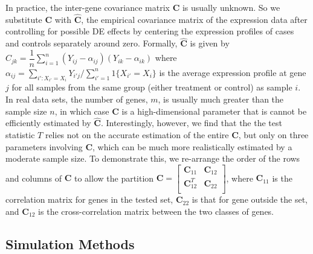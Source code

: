 \documentclass[useAMS,usenatbib, galley]{biom}
\newcommand{\OurMethod}{MEQLEA}
\begin{document}
	In practice, the inter-gene covariance matrix $\bm C$ is usually unknown. So we substitute $\bm C$ with $\hat {\bm C}$, the empirical covariance matrix of the expression data after controlling for possible DE effects by centering the expression profiles of cases and controls separately around zero. Formally, $\hat {\bm C}$ is given by $\hat C_{jk}=\dfrac{1}{n}\sum_{i=1}^n(Y_{ij}-\alpha_{ij})(Y_{ik}-\alpha_{ik})$ where $\alpha_{ij}=\sum_{i':X_{i'}=X_{i}}Y_{i'j}/\sum_{i'=1}^n1\{X_{i'}=X_{i}\}$ is the average expression profile at gene $j$ for all samples from the same group (either treatment or control) as sample $i$. In real data sets, the number of genes, $m$, is usually much greater than the sample size $n$, in which case $\bm C$ is a high-dimensional parameter that is cannot be efficiently estimated by $\hat {\bm C}$. Interestingly, however, we find that the the test statistic $T$ relies not on the accurate estimation of the entire $\bm C$, but only on three parameters involving $\bm C$, which can be much more realistically estimated by a moderate sample size. To demonstrate this, we re-arrange the order of the rows and columns of $\bm C$ to allow the partition $\bm C=\left[\begin{array}{cc}
	\bm C_{11} & \bm C_{12} \\       \bm C_{12}^T & \bm C_{22} \\      \end{array}\right] $,
	where $\bm C_{11}$ is the correlation matrix for genes in the tested set, $\bm C_{22}$ is that for gene outside the set, and $\bm C_{12}$ is the cross-correlation matrix between the two classes of genes.

	
	
	
	\subsection{Simulation Methods}
	
\end{document}
